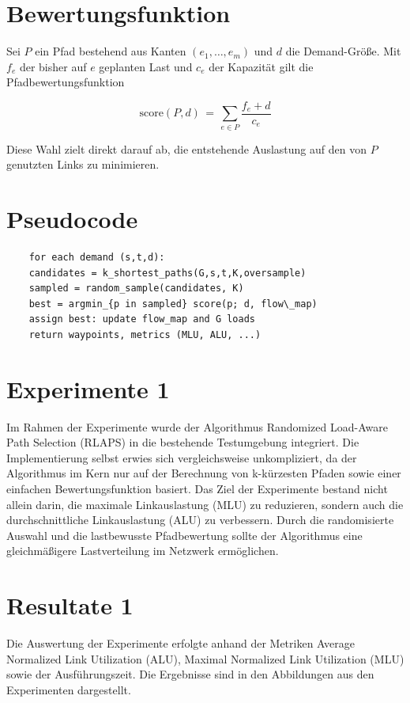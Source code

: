 \section{Bewertungsfunktion}
Sei $P$ ein Pfad bestehend aus Kanten $(e_1,\dots,e_m)$ und $d$ die Demand-Größe. Mit $f_e$ der bisher auf $e$ geplanten Last und $c_e$ der Kapazität gilt die Pfadbewertungsfunktion

$$
\mathrm{score}(P,d) \,=\, \sum_{e\in P} \frac{f_e + d}{c_e}
$$

Diese Wahl zielt direkt darauf ab, die entstehende Auslastung auf den von $P$ genutzten Links zu minimieren.

\section{Pseudocode}
\begin{verbatim}
    for each demand (s,t,d):
    candidates = k_shortest_paths(G,s,t,K,oversample)
    sampled = random_sample(candidates, K)
    best = argmin_{p in sampled} score(p; d, flow\_map)
    assign best: update flow_map and G loads
    return waypoints, metrics (MLU, ALU, ...)
\end{verbatim}


\section{Experimente 1}

Im Rahmen der Experimente wurde der Algorithmus Randomized Load-Aware Path Selection (RLAPS) in die bestehende Testumgebung integriert. Die Implementierung selbst erwies sich vergleichsweise unkompliziert, da der Algorithmus im Kern nur auf der Berechnung von k-kürzesten Pfaden sowie einer einfachen Bewertungsfunktion basiert.
Das Ziel der Experimente bestand nicht allein darin, die maximale Linkauslastung (MLU) zu reduzieren, sondern auch die durchschnittliche Linkauslastung (ALU) zu verbessern. Durch die randomisierte Auswahl und die lastbewusste Pfadbewertung sollte der Algorithmus eine gleichmäßigere Lastverteilung im Netzwerk ermöglichen.


\section{Resultate 1}
Die Auswertung der Experimente erfolgte anhand der Metriken Average Normalized Link Utilization (ALU), Maximal Normalized Link Utilization (MLU) sowie der Ausführungszeit. Die Ergebnisse sind in den Abbildungen aus den Experimenten dargestellt.

